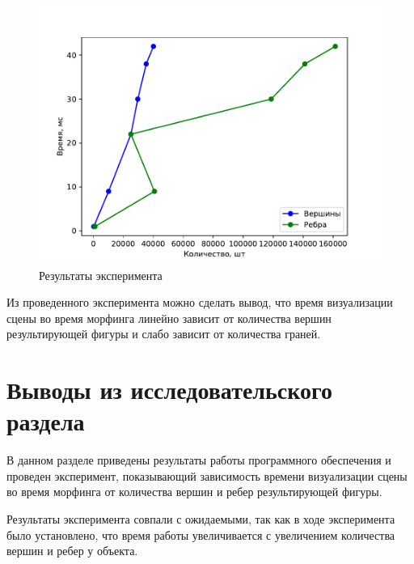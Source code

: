 \begin{figure}[h]
	\centering
	\includegraphics{images/tests.pdf}
	\caption{Результаты эксперимента}
	\label{fig:res_tests.pdf}
\end{figure}

Из проведенного эксперимента можно сделать вывод, что время визуализации сцены во время морфинга линейно зависит от количества вершин результирующей фигуры и слабо зависит от количества граней.

\section*{Выводы из исследовательского раздела}

В данном разделе приведены результаты работы программного обеспечения и проведен эксперимент, показывающий зависимость времени визуализации сцены во время морфинга от количества вершин и ребер результирующей фигуры.

Результаты эксперимента совпали с ожидаемыми, так как в ходе эксперимента было установлено, что время работы увеличивается с увеличением количества вершин и ребер у объекта.
